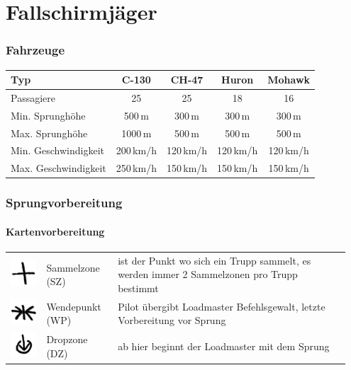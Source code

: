 \pagebreak
\chapter{Fallschirmjäger}

\subsection{Fahrzeuge}
\begin{longtable}{lcccc} 
	\toprule
	Typ & C-130 & CH-47 &	Huron	&	Mohawk \\ 
	\midrule
	Passagiere 	&	25 	&	25 	&	18 	&	16 \\ 
	Min. Sprunghöhe	& 500\,m 	& 300\,m 	&	300\,m	&	300\,m	\\
	Max. Sprunghöhe	&	1000\,m 	&	500\,m 	&	500\,m	&	500\,m \\
	Min. Geschwindigkeit	& 	200\,km/h	&	120\,km/h	&	120\,km/h	&	120\,km/h	\\ 
	Max. Geschwindigkeit	& 	250\,km/h	&	150\,km/h &	150\,km/h &	150\,km/h \\
	\bottomrule 
\end{longtable}

\subsection{Sprungvorbereitung}
\subsubsection*{Kartenvorbereitung}
\begin{tabular}{C{0.1\linewidth}m{0.2\linewidth} m{0.65\linewidth}}
	\includegraphics[scale=0.8]{../img/advanced/fallschirmspringen/sammelzone}	& Sammelzone (SZ)	& ist der Punkt wo sich ein Trupp sammelt, es werden immer 2 Sammelzonen pro Trupp bestimmt\\
	\includegraphics[scale=0.8]{../img/advanced/fallschirmspringen/wendepunkt} 	& Wendepunkt (WP) & Pilot übergibt Loadmaster Befehlsgewalt, letzte Vorbereitung vor Sprung\\
	\includegraphics[scale=0.8]{../img/advanced/fallschirmspringen/dropzone}	& Dropzone (DZ) & ab hier beginnt der Loadmaster mit dem Sprung
\end{tabular}

